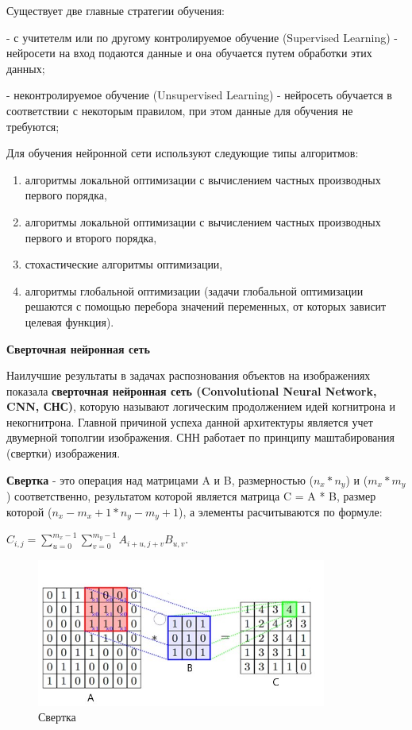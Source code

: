 \documentclass[bachelor, och, coursework]{shiza}
\begin{document}
Существует две главные стратегии обучения:

- с учитетелм или по другому контролируемое обучение (Supervised Learning) - нейросети на вход подаются данные и она обучается путем обработки этих данных;

- неконтролируемое обучение (Unsupervised Learning) - нейросеть обучается в соответствии с некоторым правилом, при этом данные для обучения не требуются;

Для обучения нейронной сети используют следующие типы алгоритмов:

\begin{enumerate}
    \item алгоритмы локальной оптимизации с вычислением частных производных первого порядка,
    \item алгоритмы локальной оптимизации с вычислением частных производных первого и второго порядка,
    \item стохастические алгоритмы оптимизации,
    \item алгоритмы глобальной оптимизации (задачи глобальной оптимизации решаются с помощью перебора значений переменных, от которых зависит целевая функция).
\end{enumerate}

\begin{center}
    \textbf{Сверточная нейронная сеть}
\end{center}

Наилучшие результаты в задачах распознования объектов на изображениях показала \textbf{сверточная нейронная сеть (Convolutional Neural Network, CNN, СНС)}, 
которую называют логическим продолжением идей когнитрона и некогнитрона. Главной причиной успеха данной архитектуры является учет двумерной тополгии изображения.
СНН работает по принципу маштабирования (свертки) изображения.

\textbf{Свертка} - это операция над матрицами A и B, размерностью  ($n_x * n_y$) и ($m_x * m_y$) соответственно, результатом которой является матрица C = A * B,
размер которой ($n_x - m_x + 1 * n_y - m_y + 1$), а элементы расчитываются по формуле:
\begin{center}
    $ C_{i,j} = \sum\limits_{u=0}^{m_x-1}\sum\limits_{v=0}^{m_y-1}A_{i+u,j+v}B_{u,v}$.
\end{center}

\begin{figure}[H]
    \centering
    \includegraphics[width=0.85\textwidth]{6}
    \caption{Свертка}
    \label{fig:img1}
\end{figure}
\end{document}
